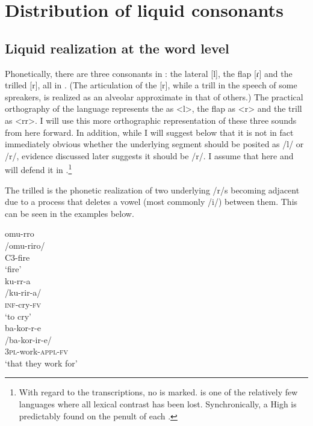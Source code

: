 \documentclass[output=paper,modfonts,nonflat,
 hidelinks
]{langsci/langscibook}
\begin{document}
\section{Distribution of liquid consonants}
\subsection{Liquid realization at the word level}

Phonetically, there are three  consonants in : the lateral [l], the flap [ɾ] and the trilled [r], all in . (The articulation of the [r], while a trill in the speech of some  spreakers, is realized as an alveolar approximate in that of others.) The practical orthography of the language represents the  as <l>, the flap as <r> and the trill as <rr>. I will use this more orthographic representation of these three sounds from here forward. In addition, while I will suggest below that it is not in fact immediately obvious whether the underlying segment should be posited as /l/ or /r/, evidence discussed later suggests it should be /r/. I assume that here and will defend it in .\footnote{With regard to the  transcriptions, no  is marked.  is one of the relatively few  languages where all lexical  contrast has been lost. Synchronically, a High is predictably found on the penult of each .}%
%

The trilled  is the phonetic realization of two underlying /r/s becoming adjacent due to a process that deletes a vowel (most commonly /i/) between them. This can be seen in the examples below.

\ea\label{ex:bickmore:1}
\ea\label{ex:bickmore:1a}
\glll omu-rro \\
/omu-riro/\\
C3-fire\\
\glt ‘fire’\\
\ex\label{ex:bickmore:1b}
\glll ku-rr-a \\
/ku-rir-a/\\
\textsc{inf-}\textup{cry}\textsc{{}-fv}\\
\glt  ‘to cry’\\
\ex\label{ex:bickmore:1c}
\glll ba-kor-r-e \\
/ba-kor-ir-e/\\
\textsc{3pl-}\textup{work}\textsc{{}-appl-fv}\\
\glt  ‘that they work for’\\
\z
\z
%
%
\end{document}
